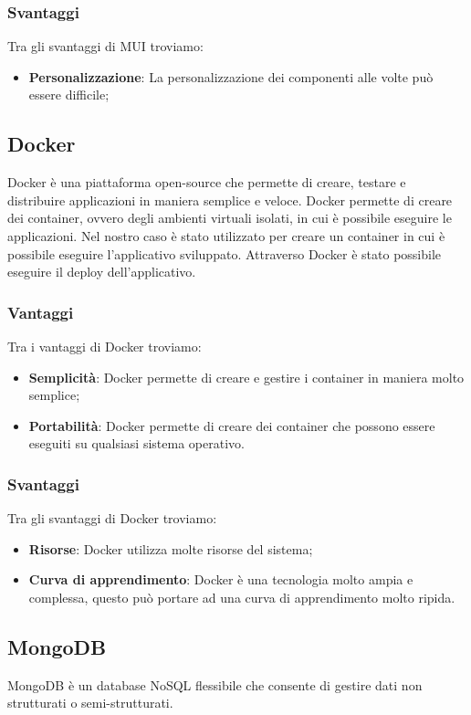 \subsubsection*{Svantaggi}
Tra gli svantaggi di MUI troviamo:
\begin{itemize}
    \item \textbf{Personalizzazione}: La personalizzazione dei componenti alle volte può essere difficile;
\end{itemize}


\subsection*{Docker}
Docker è una piattaforma open-source che permette di creare, testare e distribuire applicazioni in maniera semplice e veloce.
Docker permette di creare dei container, ovvero degli ambienti virtuali isolati, in cui è possibile eseguire le applicazioni. Nel nostro caso 
è stato utilizzato per creare un container in cui è possibile eseguire l'applicativo sviluppato. Attraverso Docker è stato possibile
eseguire il deploy dell'applicativo.

\subsubsection*{Vantaggi}
Tra i vantaggi di Docker troviamo:
\begin{itemize}
    \item \textbf{Semplicità}: Docker permette di creare e gestire i container in maniera molto semplice;
    \item \textbf{Portabilità}: Docker permette di creare dei container che possono essere eseguiti su qualsiasi sistema operativo.
\end{itemize}

\subsubsection*{Svantaggi}
Tra gli svantaggi di Docker troviamo:
\begin{itemize}
    \item \textbf{Risorse}: Docker utilizza molte risorse del sistema;
    \item \textbf{Curva di apprendimento}: Docker è una tecnologia molto ampia e complessa, questo può portare ad una curva di apprendimento molto ripida.
\end{itemize}


\subsection*{MongoDB}
MongoDB è un database NoSQL flessibile che consente di gestire dati non strutturati o semi-strutturati. 

